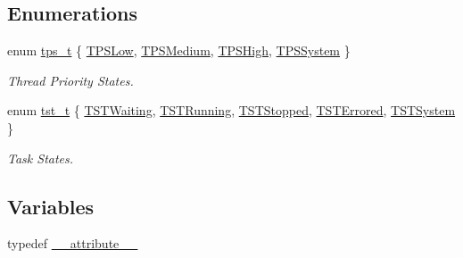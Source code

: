 \subsection*{Enumerations}
\begin{DoxyCompactItemize}
\item 
enum \hyperlink{a00044_a5ee504524d7b79ed81a1ed7b325dc9c6_a5ee504524d7b79ed81a1ed7b325dc9c6}{tps\+\_\+t} \{ \hyperlink{a00044_a5ee504524d7b79ed81a1ed7b325dc9c6_a5ee504524d7b79ed81a1ed7b325dc9c6a9d68d2bd5bb4b7a813b53a3c6efb26a3}{T\+P\+S\+Low}, 
\hyperlink{a00044_a5ee504524d7b79ed81a1ed7b325dc9c6_a5ee504524d7b79ed81a1ed7b325dc9c6ab65c1c2b03accd655caa87db240a87db}{T\+P\+S\+Medium}, 
\hyperlink{a00044_a5ee504524d7b79ed81a1ed7b325dc9c6_a5ee504524d7b79ed81a1ed7b325dc9c6a99b1e5d2af2ea961d67a5d0f982fb0c2}{T\+P\+S\+High}, 
\hyperlink{a00044_a5ee504524d7b79ed81a1ed7b325dc9c6_a5ee504524d7b79ed81a1ed7b325dc9c6a557f7fd60ef979a8df84e7eea7de9f9b}{T\+P\+S\+System}
 \}\begin{DoxyCompactList}\small\item\em Thread Priority States. \end{DoxyCompactList}
\item 
enum \hyperlink{a00044_a3895f03bb811310833570ff0b8a403d9_a3895f03bb811310833570ff0b8a403d9}{tst\+\_\+t} \{ \newline
\hyperlink{a00044_a3895f03bb811310833570ff0b8a403d9_a3895f03bb811310833570ff0b8a403d9a4e9798f9291920da4dba13ed8d1bf2b4}{T\+S\+T\+Waiting}, 
\hyperlink{a00044_a3895f03bb811310833570ff0b8a403d9_a3895f03bb811310833570ff0b8a403d9ac0336457632847436b12bd36b2642808}{T\+S\+T\+Running}, 
\hyperlink{a00044_a3895f03bb811310833570ff0b8a403d9_a3895f03bb811310833570ff0b8a403d9a29a580a1a7b4350246c83d171567f7fc}{T\+S\+T\+Stopped}, 
\hyperlink{a00044_a3895f03bb811310833570ff0b8a403d9_a3895f03bb811310833570ff0b8a403d9a8117b53a7299ca12df9b2a7bd320689f}{T\+S\+T\+Errored}, 
\newline
\hyperlink{a00044_a3895f03bb811310833570ff0b8a403d9_a3895f03bb811310833570ff0b8a403d9a1b2cdb1c39a3cb21ddb3efc42d1cc5b9}{T\+S\+T\+System}
 \}\begin{DoxyCompactList}\small\item\em Task States. \end{DoxyCompactList}
\end{DoxyCompactItemize}
\subsection*{Variables}
\begin{DoxyCompactItemize}
\item 
typedef \hyperlink{a00044_acf8c839d8a7a12772ebd4b8a4c087034_acf8c839d8a7a12772ebd4b8a4c087034}{\+\_\+\+\_\+attribute\+\_\+\+\_\+}
\end{DoxyCompactItemize}


